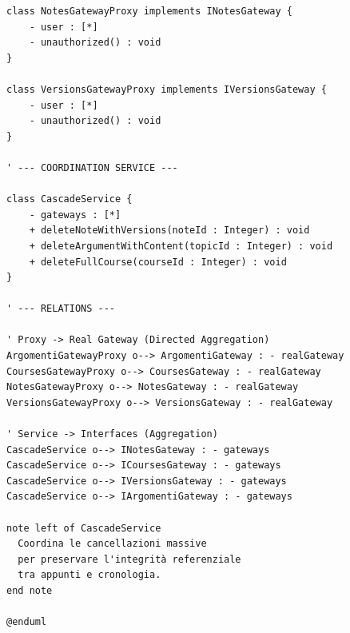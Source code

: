 \begin{verbatim}
class NotesGatewayProxy implements INotesGateway {
    - user : [*]
    - unauthorized() : void
}

class VersionsGatewayProxy implements IVersionsGateway {
    - user : [*]
    - unauthorized() : void
}

' --- COORDINATION SERVICE ---

class CascadeService {
    - gateways : [*]
    + deleteNoteWithVersions(noteId : Integer) : void
    + deleteArgumentWithContent(topicId : Integer) : void
    + deleteFullCourse(courseId : Integer) : void
}

' --- RELATIONS ---

' Proxy -> Real Gateway (Directed Aggregation)
ArgomentiGatewayProxy o--> ArgomentiGateway : - realGateway
CoursesGatewayProxy o--> CoursesGateway : - realGateway
NotesGatewayProxy o--> NotesGateway : - realGateway
VersionsGatewayProxy o--> VersionsGateway : - realGateway

' Service -> Interfaces (Aggregation)
CascadeService o--> INotesGateway : - gateways
CascadeService o--> ICoursesGateway : - gateways
CascadeService o--> IVersionsGateway : - gateways
CascadeService o--> IArgomentiGateway : - gateways

note left of CascadeService
  Coordina le cancellazioni massive 
  per preservare l'integrità referenziale 
  tra appunti e cronologia.
end note

@enduml
\end{verbatim}

